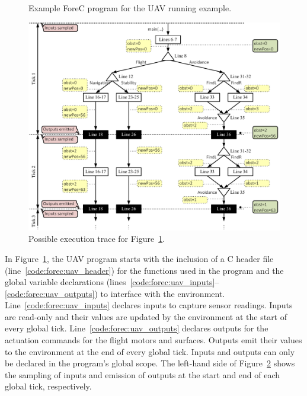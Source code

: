 \begin{figure}
	\centering
	\begin{minipage}[t]{0.75\columnwidth}
		
	\end{minipage}
	\caption{Example ForeC program for the UAV running example.}
	\label{fig:forec:uav}
\end{figure}

\begin{figure}
	\includegraphics[width=\columnwidth]{images/uav_timing1.pdf}
	\caption{Possible execution trace for Figure~\ref{fig:forec:uav}.}
	\label{fig:forec:uav_timing1}
\end{figure}

In Figure~\ref{fig:forec:uav}, the UAV program starts with 
the inclusion of a C header file (line~\ref{code:forec:uav_header}) 
for the functions used in the 
program and the global variable declarations 
(lines~\ref{code:forec:uav_inputs}--\ref{code:forec:uav_outputs}) to 
interface with the environment. Line~\ref{code:forec:uav_inputs}
declares inputs to capture sensor readings. Inputs
are read-only and their values are updated by the
environment at the start of every global tick. 
Line~\ref{code:forec:uav_outputs} declares outputs
for the actuation commands for the flight motors and
surfaces. Outputs emit their values to the
environment at the end of every global tick. Inputs and
outputs can only be declared in the program's
global scope. The left-hand side of Figure~\ref{fig:forec:uav_timing1}
shows the sampling of inputs and emission of outputs 
at the start and end of each global tick, respectively.

